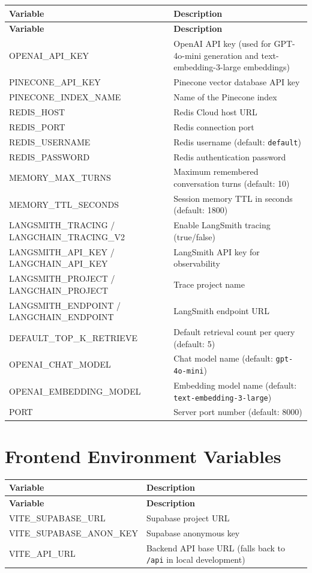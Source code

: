 \documentclass[12pt,a4paper]{book}
\numberwithin{table}{chapter}
\numberwithin{figure}{chapter}
\numberwithin{equation}{chapter}
\begin{document}
\begin{longtable}{|p{2in}|p{4in}|}
\hline
\textbf{Variable} & \textbf{Description}\\
\hline
\endfirsthead
\hline
\textbf{Variable} & \textbf{Description}\\
\hline
\endhead
\hline
OPENAI\_API\_KEY & OpenAI API key (used for GPT-4o-mini generation and text-embedding-3-large embeddings)\\
\hline
PINECONE\_API\_KEY & Pinecone vector database API key\\
\hline
PINECONE\_INDEX\_NAME & Name of the Pinecone index\\
\hline
REDIS\_HOST & Redis Cloud host URL\\
\hline
REDIS\_PORT & Redis connection port\\
\hline
REDIS\_USERNAME & Redis username (default: \texttt{default})\\
\hline
REDIS\_PASSWORD & Redis authentication password\\
\hline
MEMORY\_MAX\_TURNS & Maximum remembered conversation turns (default: 10)\\
\hline
MEMORY\_TTL\_SECONDS & Session memory TTL in seconds (default: 1800)\\
\hline
LANGSMITH\_TRACING / LANGCHAIN\_TRACING\_V2 & Enable LangSmith tracing (true/false)\\
\hline
LANGSMITH\_API\_KEY / LANGCHAIN\_API\_KEY & LangSmith API key for observability\\
\hline
LANGSMITH\_PROJECT / LANGCHAIN\_PROJECT & Trace project name\\
\hline
LANGSMITH\_ENDPOINT / LANGCHAIN\_ENDPOINT & LangSmith endpoint URL\\
\hline
DEFAULT\_TOP\_K\_RETRIEVE & Default retrieval count per query (default: 5)\\
\hline
OPENAI\_CHAT\_MODEL & Chat model name (default: \texttt{gpt-4o-mini})\\
\hline
OPENAI\_EMBEDDING\_MODEL & Embedding model name (default: \texttt{text-embedding-3-large})\\
\hline
PORT & Server port number (default: 8000)\\
\hline
\end{longtable}

\section{Frontend Environment Variables}

\begin{longtable}{|p{2in}|p{4in}|}
\hline
\textbf{Variable} & \textbf{Description}\\
\hline
\endfirsthead
\hline
\textbf{Variable} & \textbf{Description}\\
\hline
\endhead
\hline
VITE\_SUPABASE\_URL & Supabase project URL\\
\hline
VITE\_SUPABASE\_ANON\_KEY & Supabase anonymous key\\
\hline
VITE\_API\_URL & Backend API base URL (falls back to \texttt{/api} in local development)\\
\hline
\end{longtable}
\end{document}
